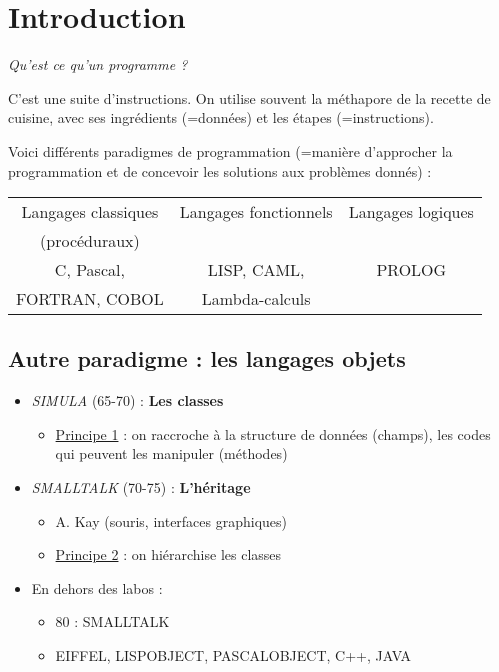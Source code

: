 \documentclass{article}
\begin{document}
\section{Introduction}

\emph{Qu'est ce qu'un programme ?}

C'est une suite d'instructions.
On utilise souvent la méthapore de la recette de cuisine,
avec ses ingrédients (=données) et les étapes (=instructions).

Voici différents paradigmes de programmation (=manière d'approcher la programmation et de concevoir
les solutions aux problèmes donnés) :

\begin{tabular}{|c|c|c|}
	\hline
	Langages classiques & Langages fonctionnels & Langages logiques \\
	(procéduraux) & & \\
	\hline
	C, Pascal, & LISP, CAML, & PROLOG \\
	FORTRAN, COBOL & Lambda-calculs & \\
	\hline
\end{tabular}

\subsection{Autre paradigme : les langages objets}

\begin{itemize}
	\item \emph{SIMULA} (65-70) : \textbf{Les classes}
		\begin{itemize}
			\item \underline{Principe 1} : on raccroche à la structure de données (champs), 
				les codes qui peuvent les manipuler (méthodes)
		\end{itemize}
	\item \emph{SMALLTALK} (70-75) : \textbf{L'héritage}
		\begin{itemize}
			\item A. Kay (souris, interfaces graphiques)
			\item \underline{Principe 2} : on hiérarchise les classes
		\end{itemize}
	\item En dehors des labos :
		\begin{itemize}
			\item 80 : SMALLTALK
			\item EIFFEL, LISPOBJECT, PASCALOBJECT, C++, JAVA 
		\end{itemize}
\end{itemize}
\end{document}
